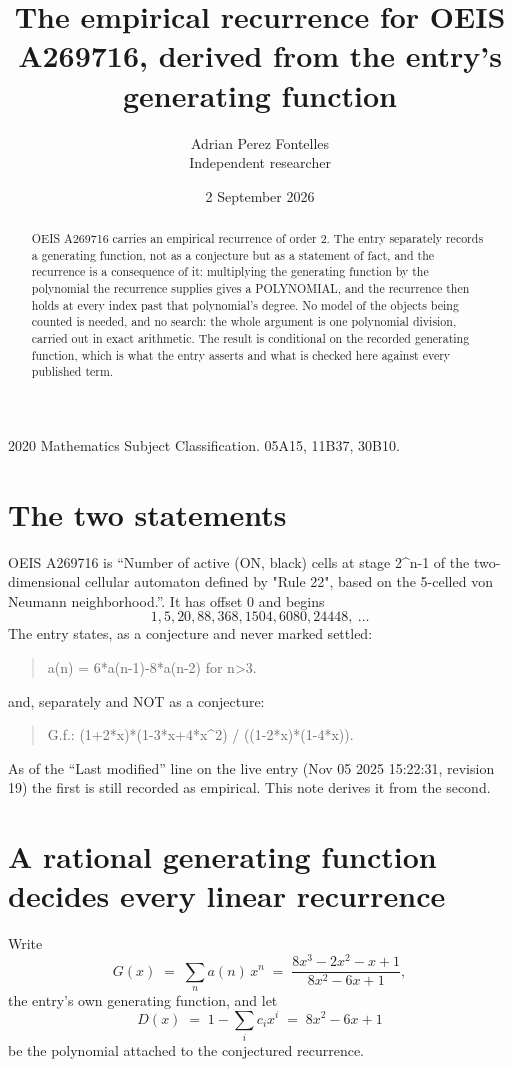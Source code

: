 \documentclass[11pt,a4paper]{article}
\title{The empirical recurrence for OEIS A269716, derived from the entry's generating function}
\author{Adrian Perez Fontelles\\ \small Independent researcher}
\date{2 September 2026}
\theoremstyle{plain}
\theoremstyle{definition}
\begin{document}
\maketitle

\begin{abstract}
OEIS A269716 carries an empirical recurrence of order $2$. The entry separately records a
generating function, not as a conjecture but as a statement of fact, and the recurrence is a
consequence of it: multiplying the generating function by the polynomial the recurrence
supplies gives a POLYNOMIAL, and the recurrence then holds at every index past that
polynomial's degree. No model of the objects being counted is needed, and no search: the
whole argument is one polynomial division, carried out in exact arithmetic. The result is
conditional on the recorded generating function, which is what the entry asserts and what is
checked here against every published term.
\end{abstract}

\noindent\small 2020 Mathematics Subject Classification. 05A15, 11B37, 30B10.\normalsize

\section{The two statements}

OEIS A269716 is ``Number of active (ON, black) cells at stage 2\^{}n-1 of the two-dimensional cellular automaton defined by "Rule 22", based on the 5-celled von Neumann neighborhood.''. It has offset $0$ and begins
\[
1, 5, 20, 88, 368, 1504, 6080, 24448,\ \dots
\]
The entry states, as a conjecture and never marked settled:
\begin{quote}
a(n) = 6*a(n-1)-8*a(n-2) for n>3.
\end{quote}
and, separately and NOT as a conjecture:
\begin{quote}
G.f.: (1+2*x)*(1-3*x+4*x\^{}2) / ((1-2*x)*(1-4*x)).
\end{quote}
As of the ``Last modified'' line on the live entry (Nov 05 2025 15:22:31, revision 19) the first is still
recorded as empirical. This note derives it from the second.

\section{A rational generating function decides every linear recurrence}

Write
\[
G(x)\;=\;\sum_{n}a(n)\,x^{n}\;=\;\frac{8 x^{3} - 2 x^{2} - x + 1}{8 x^{2} - 6 x + 1},
\]
the entry's own generating function, and let
\[
D(x)\;=\;1-\sum_i c_i x^{i}\;=\;8 x^{2} - 6 x + 1
\]
be the polynomial attached to the conjectured recurrence.
\end{document}
